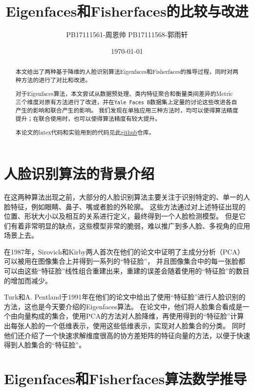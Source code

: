 \documentclass{ctexart}
\title{Eigenfaces和Fisherfaces的比较与改进}
\date{\today}
\author{PB17111561-周恩帅 PB17111568-郭雨轩}
\begin{document}
    \maketitle

    \begin{abstract}
        本文给出了两种基于降维的人脸识别算法Eigenfaces和Fisherfaces的推导过程，同时对两种方法的进行了对比和改进。
        
        对于Eigenfaces算法，本文尝试从数据预处理、类内特征聚合和衡量类间差异的Metric三个维度对原有方法进行了改进，并在\texttt{Yale Faces B}数据集上定量的讨论这些改进各自产生的影响和联合产生的影响。
        我们发现在单独应用三种方法时，均可以使得算法精度提升；在联合使用时，也可以使得算法精度有较大提升。

        本论文的latex代码和实验用到的代码见此\href{https://github.com/SkilfulBugsMaker/Analysis-of-Eigenface-and-Fisherface}{github}仓库。
    \end{abstract}

    \tableofcontents
    \newpage
    

    \section{人脸识别算法的背景介绍}
    在这两种算法出现之前，大部分的人脸识别算法主要关注于识别特定的、单一的人脸特征，例如眼睛、鼻子、嘴或者脸的外轮廓。
    这些方法通过对上述特征出现的位置、形状大小以及相互的关系进行定义，最终得到一个人脸检测模型。
    但是它们有着非常明显的缺点，这些模型非常的脆弱，难以推广到多人脸、多视角的应用场景上去。
    
    在1987年，Sirovich和Kirby两人首次在他们的论文\cite{Sirovich:87}中证明了主成分分析（PCA）可以被用在图像集合上并得到一系列的“特征脸”，
    并且图像集合中的每一张脸都可以由这些“特征脸”线性组合重建出来，重建的误差会随着使用的“特征脸”的数目的增加而减少。

    Turk和A. Pentland于1991年在他们的论文\cite{doi:10.1162/jocn.1991.3.1.71}中给出了使用“特征脸”进行人脸识别的方法，这也是今天要介绍的Eigenfaces算法。
    在论文中，他们将人脸集合看成是一个由向量构成的集合，使用PCA的方法对人脸降维，再使用得到的“特征脸”计算出每张人脸的一个低维表示，使用这些低维表示，实现对人脸集合的分类。
    同时他们还介绍了一个快速求解维度很高的协方差矩阵的特征向量的方法，以便于快速得到人脸集合的“特征脸”。


    \section{Eigenfaces和Fisherfaces算法数学推导}
\end{document}
